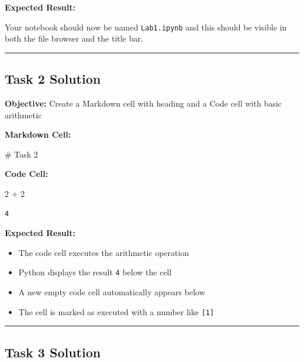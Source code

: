 \documentclass[
  11pt,
]{article}
\newenvironment{Shaded}{\begin{snugshade}}{\end{snugshade}}
\newcommand{\DecValTok}[1]{\textcolor[rgb]{0.68,0.00,0.00}{#1}}
\newcommand{\NormalTok}[1]{\textcolor[rgb]{0.00,0.23,0.31}{#1}}
\newcommand{\OperatorTok}[1]{\textcolor[rgb]{0.37,0.37,0.37}{#1}}
\begin{document}
\textbf{Expected Result:}

Your notebook should now be named \texttt{Lab1.ipynb} and this should be
visible in both the file browser and the title bar.

\begin{center}\rule{0.5\linewidth}{0.5pt}\end{center}

\subsection{Task 2 Solution}\label{task-2-solution}

\textbf{Objective:} Create a Markdown cell with heading and a Code cell
with basic arithmetic

\textbf{Markdown Cell:}

\begin{Shaded}
\begin{Highlighting}[]
\NormalTok{\# Task 2}
\end{Highlighting}
\end{Shaded}

\textbf{Code Cell:}

\begin{Shaded}
\begin{Highlighting}[]
\DecValTok{2} \OperatorTok{+} \DecValTok{2}
\end{Highlighting}
\end{Shaded}

\begin{verbatim}
4
\end{verbatim}

\textbf{Expected Result:}

\begin{itemize}
\item
  The code cell executes the arithmetic operation
\item
  Python displays the result \texttt{4} below the cell
\item
  A new empty code cell automatically appears below
\item
  The cell is marked as executed with a number like \texttt{{[}1{]}}
\end{itemize}

\begin{center}\rule{0.5\linewidth}{0.5pt}\end{center}

\subsection{Task 3 Solution}\label{task-3-solution}
\end{document}
